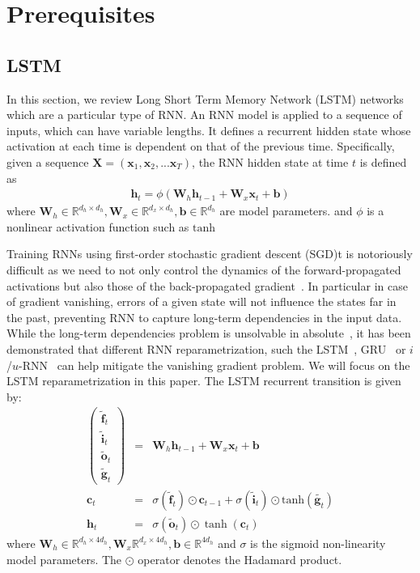 \documentclass{article} %
\newcommand{\vect}[1]{\mathbf{#1}}
\newcommand{\mat}[1]{\mathbf{#1}}
\newcommand{\ewprod}{\odot}
\newcommand{\reals}{\mathbb{R}}
\begin{document}
\section{Prerequisites}
\label{sec:prerequisites}

\subsection{LSTM}

In this section, we review Long Short Term Memory Network  (LSTM) networks~\cite{lstm} which
are a particular type of RNN. An RNN model is applied to a sequence of inputs, which can have variable lengths.
It defines a recurrent hidden state whose activation at each time is dependent on that of the previous time. Specifically, given a sequence
$\mat{X} = ( \vect{x}_1, \vect{x}_2, ... \vect{x}_T )$, the RNN  hidden state at time $t$ is defined as
\begin{eqnarray}
  \mat{h}_t = \phi(\mat{W}_h \vect{h}_{t-1} + \mat{W}_x  \vect{x}_t + \vect{b})
\end{eqnarray}
where $\mat{W}_h \in \reals^{d_h \times d_h}, \mat{W}_x \in \reals^{d_x \times d_h}, \vect{b} \in \reals^{d_h}$ are model parameters.
and $\phi$  is a nonlinear activation function such as $\mathrm{tanh}$


Training RNNs using first-order stochastic gradient descent (SGD)t is notoriously difficult as we need to not only control the dynamics of the forward-propagated activations but also those of the back-propagated gradient~\cite{bengio1994learning,hochreiter1991untersuchungen,pascanudifficulty}.
In particular in case of gradient vanishing, errors of a given state will not influence the states far in the past,
 preventing RNN to capture long-term dependencies in the input data.
While the long-term dependencies problem is unsolvable in absolute~\cite{bengio1994learning}, it has been demonstrated that different RNN reparametrization, such the LSTM~\cite{lstm}, GRU~\cite{cho2014learning} or $i$/$u$-RNN~\cite{le2015simple,urnn} can help mitigate the vanishing gradient problem.
We will focus on the LSTM reparametrization in this paper. The LSTM recurrent transition is given by:
\begin{eqnarray}
\left(\begin{array}{ccc}
\tilde{\vect{f}}_t \\
\tilde{\vect{i}}_t \\
\tilde{\vect{o}}_t \\
\tilde{\vect{g}}_t
\end{array}\right)
 &=&
 \mat{W}_h \vect{h}_{t-1} +
 \mat{W}_x \vect{x}_t +
 \vect{b}
 \\
\vect{c}_t &= &\sigma(\tilde{\vect{f}}_t) \ewprod \vect{c}_{t-1} +
\sigma(\tilde{\vect{i}}_t) \ewprod \mathrm{tanh}(\tilde{\vect{g}_t}) \\
\vect{h}_t &= &\sigma(\tilde{\vect{o}}_t) \ewprod \tanh(\vect{c}_t)
\end{eqnarray}
where $\vect{W}_h \in \reals^{d_h \times 4 d_h}, \vect{W}_x \reals^{d_x \times 4 d_h}, \vect{b} \in \reals^{4 d_h}$ and $\sigma$ is the sigmoid non-linearity model parameters. The $\ewprod$ operator denotes the Hadamard product.
\end{document}
